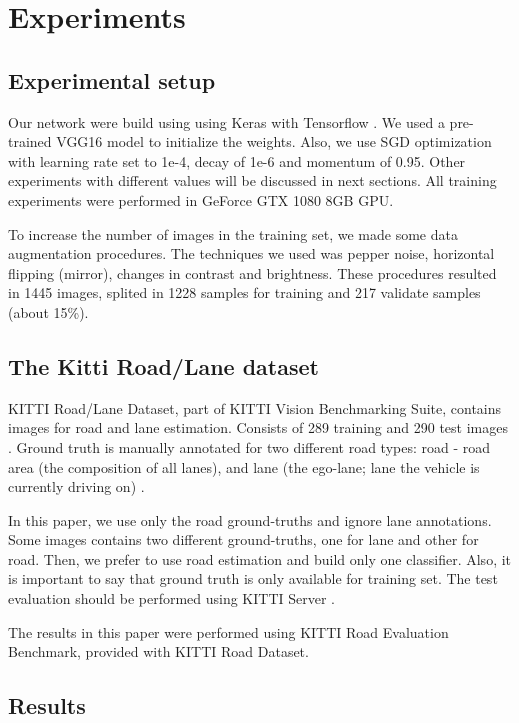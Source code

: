 \section{Experiments}
\label{sec:experiments}

\subsection{Experimental setup}

Our network were build using using Keras \cite{chollet2015keras} with Tensorflow \cite{tensorflow2015-whitepaper}. We used a pre-trained VGG16 model to initialize the weights. Also, we use SGD optimization with learning rate set to 1e-4, decay of 1e-6 and momentum of 0.95. Other experiments with different values will be discussed in next sections. All training experiments were performed in GeForce GTX 1080 8GB GPU.

To increase the number of images in the training set, we made some data augmentation procedures. The techniques we used was pepper noise, horizontal flipping (mirror), changes in contrast and brightness. These procedures resulted in 1445 images, splited in 1228 samples for training and 217 validate samples (about 15\%).

\subsection{The Kitti Road/Lane dataset}

KITTI Road/Lane Dataset, part of KITTI Vision Benchmarking Suite, contains  images for road and lane estimation. Consists of 289 training and 290 test images . Ground truth is manually annotated for two different road types: road - road area (the composition of all lanes), and lane (the ego-lane; lane the vehicle is currently driving on) \cite{KITTI}. 

In this paper, we use only the road ground-truths and ignore lane annotations. Some images contains two different ground-truths, one for lane and other for road. Then, we prefer to use road estimation and build only one classifier. Also, it is important to say that ground truth is only available for training set. The test evaluation should be performed using KITTI Server \cite{KITTI}. 

The results in this paper were performed using KITTI Road Evaluation Benchmark, provided with KITTI Road Dataset. %

\subsection{Results}

